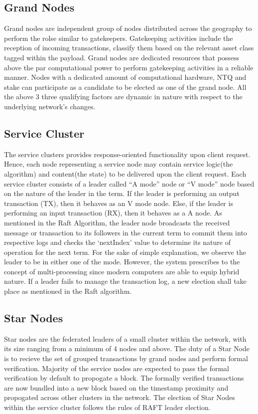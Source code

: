 \documentclass[]{article}
\begin{document}
\subsection{Grand Nodes}
Grand nodes are independent group of nodes distributed across the geography to perform the rolse similar to gatekeepers.
Gatekeeping activities include the reception of incoming transactions, classify them based on the relevant asset class tagged within the payload.
Grand nodes are dedicated resources that possess above the par computational power to perform gatekeeping activities in a reliable manner. Nodes with a dedicated amount of computational hardware, NTQ and stake can participate as a candidate to be elected as one of the grand node. All the above 3 three qualifying factors are dynamic in nature with respect to the underlying network's changes.

\subsection{Service Cluster}
The service clusters provides response-oriented functionality upon client request. Hence, each node representing a service node may contain service logic(the algorithm) and content(the state) to be delivered upon the client request. 
Each service cluster consists of a leader called “A mode” node or “V mode” node based on the nature of the leader in the term. If the leader is performing an output transaction (TX), then it behaves as an V mode node. Else, if the leader is performing an input transaction (RX), then it behaves as a A node. As mentioned in the Raft Algorithm\cite{ARTICLE:2}, the leader node broadcasts the received message or transaction to its followers in the current term to commit them into respective logs and checks the ‘nextIndex’ value to determine its nature of operation for the next term. 
For the sake of simple explanation, we observe the leader to be in either one of the mode. However, the system prescribes to the concept of multi-processing since modern computers are able to equip hybrid nature. If a leader fails to manage the transaction log, a new election shall take place as mentioned in the Raft algorithm\cite{ARTICLE:2}.

\subsection{Star Nodes}
Star nodes are the federated leaders of a small cluster within the network, with its size ranging from a minimum of 4 nodes and above.
The duty of a Star Node is to recieve the set of grouped transactions by grand nodes and perform formal verification.
Majority of the service nodes are expected to pass the formal verification by default to propogate a block. The formally verified transactions are now bundled into a new block based on the timestamp proximity and propogated across other clusters in the network.
The election of Star Nodes within the service cluster follows the rules of RAFT leader election.
\end{document}
